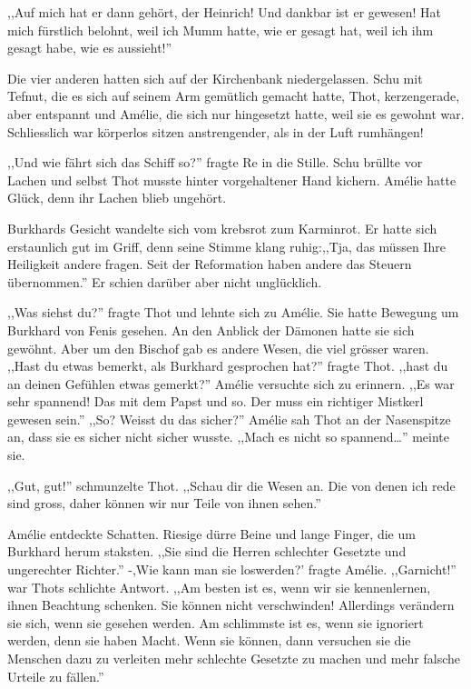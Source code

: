 \documentclass[11pt,titlepage,a5paper]{book}
\begin{document}
,,Auf mich hat er dann gehört, der Heinrich! Und dankbar ist er gewesen! Hat mich fürstlich belohnt, weil ich Mumm hatte, wie er gesagt hat, weil ich ihm gesagt habe, wie es aussieht!''

Die vier anderen hatten sich auf der Kirchenbank niedergelassen. Schu mit Tefnut, die es sich auf seinem Arm gemütlich gemacht hatte, Thot, kerzengerade, aber entspannt und Amélie, die sich nur hingesetzt hatte, weil sie es gewohnt war. Schliesslich war körperlos sitzen anstrengender, als in der Luft rumhängen!

,,Und wie fährt sich das Schiff so?'' fragte Re in die Stille. Schu brüllte vor Lachen und selbst Thot musste hinter vorgehaltener Hand kichern. Amélie hatte Glück, denn ihr Lachen blieb ungehört.

Burkhards Gesicht wandelte sich vom krebsrot zum Karminrot. Er hatte sich erstaunlich gut im Griff, denn seine Stimme klang ruhig:,,Tja, das müssen Ihre Heiligkeit andere fragen. Seit der Reformation haben andere das Steuern übernommen.'' Er schien darüber aber nicht unglücklich.

,,Was siehst du?'' fragte Thot und lehnte sich zu Amélie. Sie hatte Bewegung um Burkhard von Fenis gesehen. An den Anblick der Dämonen hatte sie sich gewöhnt. Aber um den Bischof gab es andere Wesen, die viel grösser waren. ,,Hast du etwas bemerkt, als Burkhard gesprochen hat?'' fragte Thot. ,,hast du an deinen Gefühlen etwas gemerkt?'' Amélie versuchte sich zu erinnern. ,,Es war sehr spannend! Das mit dem Papst und so. Der muss ein richtiger Mistkerl gewesen sein.'' ,,So? Weisst du das sicher?'' Amélie sah Thot an der Nasenspitze an, dass sie es sicher nicht sicher wusste. ,,Mach es nicht so spannend\dots'' meinte sie.

,,Gut, gut!'' schmunzelte Thot. ,,Schau dir die Wesen an. Die von denen ich rede sind gross, daher können wir nur Teile von ihnen sehen.''

Amélie entdeckte Schatten. Riesige dürre Beine und lange Finger, die um Burkhard herum staksten. ,,Sie sind die Herren schlechter Gesetzte und ungerechter Richter.'' -,Wie kann man sie loswerden?' fragte Amélie. ,,Garnicht!'' war Thots schlichte Antwort. ,,Am besten ist es, wenn wir sie kennenlernen, ihnen Beachtung schenken. Sie können nicht verschwinden! Allerdings verändern sie sich, wenn sie gesehen werden. Am schlimmste ist es, wenn sie ignoriert werden, denn sie haben Macht. Wenn sie können, dann versuchen sie die Menschen dazu zu verleiten mehr schlechte Gesetzte zu machen und mehr falsche Urteile zu fällen.''
\end{document}
